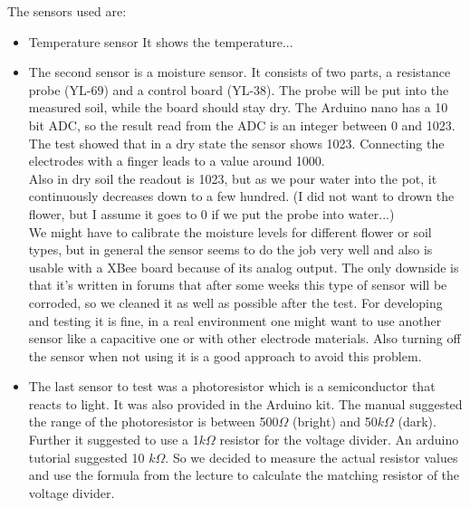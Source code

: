 \documentclass[12pt,a4paper,titlepage,oneside]{article}
\begin{document}
The sensors used are:
\begin{itemize}

\item Temperature sensor
It shows the temperature...

\item The second sensor is a moisture sensor. It consists of two parts, a resistance probe (YL-69) and a control board (YL-38). The probe will be put into the measured soil, while the board should stay dry. The Arduino nano has a 10 bit ADC, so the result read from the ADC is an integer between 0 and 1023.\\


The test showed that in a dry state the sensor shows 1023. Connecting the electrodes with a finger leads to a value around 1000.\\
Also in dry soil the readout is 1023, but as we pour water into the pot, it continuously decreases down to a few hundred. (I did not want to drown the flower, but I assume it goes to 0 if we put the probe into water...)\\

We might have to calibrate the moisture levels for different flower or soil types, but in general the sensor seems to do the job very well and also is usable with a XBee board because of its analog output. The only downside is that it's written in forums that after some weeks this type of sensor will be corroded, so we cleaned it as well as possible after the test. For developing and testing it is fine, in a real environment one might want to use another sensor like a capacitive one or with other electrode materials. Also turning off the sensor when not using it is a good approach to avoid this problem.\\

\item
The last sensor to test was a photoresistor which is a semiconductor that reacts to light. It was also provided in the Arduino kit. The manual suggested the range of the photoresistor is between 500$\Omega$ (bright) and 50$k\Omega$ (dark). 
Further it suggested to use a 1$k\Omega$ resistor for the voltage divider. An arduino tutorial \citep{misc:photoresistor_tutorial} suggested 10 $k\Omega$. So we decided to measure the actual resistor values and use the formula from the lecture to calculate the matching resistor of the voltage divider. %


\end{itemize}
\end{document}

